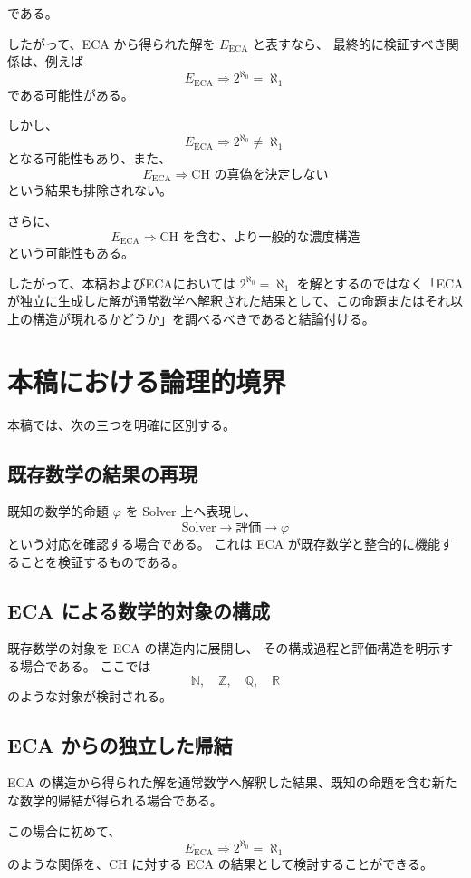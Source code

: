 \documentclass[a4paper,11pt]{article}
\begin{document}
である。

したがって、ECA から得られた解を $E_{\mathrm{ECA}}$ と表すなら、
最終的に検証すべき関係は、例えば
\[
E_{\mathrm{ECA}}
\Longrightarrow
2^{\aleph_0}=\aleph_1
\]
である可能性がある。

しかし、
\[
E_{\mathrm{ECA}}
\Longrightarrow
2^{\aleph_0}\neq\aleph_1
\]
となる可能性もあり、また、
\[
E_{\mathrm{ECA}}
\Longrightarrow
\text{CH の真偽を決定しない}
\]
という結果も排除されない。

さらに、
\[
E_{\mathrm{ECA}}
\Longrightarrow
\text{CH を含む、より一般的な濃度構造}
\]
という可能性もある。

したがって、本稿およびECAにおいては $2^{\aleph_0}=\aleph_1$ を解とするのではなく「ECA が独立に生成した解が通常数学へ解釈された結果として、この命題またはそれ以上の構造が現れるかどうか」を調べるべきであると結論付ける。

\section{本稿における論理的境界}
\label{sec:boundary}

本稿では、次の三つを明確に区別する。

\subsection{既存数学の結果の再現}

既知の数学的命題 $\varphi$ を Solver 上へ表現し、
\[
\text{Solver}
\longrightarrow
\text{評価}
\longrightarrow
\varphi
\]
という対応を確認する場合である。
これは ECA が既存数学と整合的に機能することを検証するものである。

\subsection{ECA による数学的対象の構成}

既存数学の対象を ECA の構造内に展開し、
その構成過程と評価構造を明示する場合である。
ここでは
\[
\mathbb{N},\quad
\mathbb{Z},\quad
\mathbb{Q},\quad
\mathbb{R}
\]
のような対象が検討される。

\subsection{ECA からの独立した帰結}
ECA の構造から得られた解を通常数学へ解釈した結果、既知の命題を含む新たな数学的帰結が得られる場合である。

この場合に初めて、
\[
E_{\mathrm{ECA}}
\Longrightarrow
2^{\aleph_0}=\aleph_1
\]
のような関係を、CH に対する ECA の結果として検討することができる。
\end{document}
